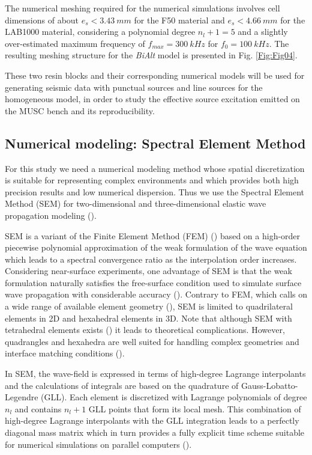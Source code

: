 \documentclass[extra,mreferee]{gji}
\newcommand{\bialt}{\textit{BiAlt} }
\begin{document}
The numerical meshing required for the numerical simulations involves cell dimensions of about $e_{s}<3.43\ mm$ for the F50 material and $e_{s}<4.66\ mm$ for the LAB1000 material, considering a polynomial degree $n_{l}+1=5$ and a slightly over-estimated maximum frequency of $f_{max}=300\ kHz$ for $f_{0}=100\ kHz$. The resulting meshing structure for the \bialt model is presented in Fig. \ref{Fig:Fig04}.

These two resin blocks and their corresponding numerical models will be used for generating seismic data with punctual sources and line sources for the homogeneous model, in order to study the effective source excitation emitted on the MUSC bench and its reproducibility.

\subsection{Numerical modeling: Spectral Element Method}

For this study we need a numerical modeling method whose spatial discretization is suitable for representing complex environments and which provides both high precision results and low numerical dispersion. Thus we use the Spectral Element Method (SEM) for two-dimensional and three-dimensional elastic wave propagation modeling (\cite{Komatitsch_SEM_1998,Komatitsch_ISM_1999,Komatitsch_SEM_2005,Festa_PML_2005}). 

SEM is a variant of the Finite Element Method (FEM) (\cite{Lysmer_FEM_1972,Seron_FEM_1990,Hulbert_FEM_1990,Tromp_SEM_2008}) based on a high-order piecewise polynomial approximation of the weak formulation of the wave equation which leads to a spectral convergence ratio as the interpolation order increases. Considering near-surface experiments, one advantage of SEM is that the weak formulation naturally satisfies the free-surface condition used to simulate surface wave propagation with considerable accuracy (\cite{komatitsch1998spectral,komatitsch1999spectral,Komatitsch_SEM_2005}). Contrary to FEM, which calls on a wide range of available element geometry (\cite{dhatt1984finite}), SEM is limited to quadrilateral elements in 2D and hexahedral elements in 3D. Note that although SEM with tetrahedral elements exists (\cite{komatitsch2001wave}) it leads to theoretical complications. However, quadrangles and hexahedra are well suited for handling complex geometries and interface matching conditions (\cite{Cristini_SEM_2012}). 

In SEM, the wave-field is expressed in terms of high-degree Lagrange interpolants and the calculations of integrals are based on the quadrature of Gauss-Lobatto-Legendre (GLL). Each element is discretized with Lagrange polynomials of degree $n_{l}$ and contains $n_{l}+1$ GLL points that form its local mesh. This combination of high-degree Lagrange interpolants with the GLL integration leads to a perfectly diagonal mass matrix which in turn provides a fully explicit time scheme suitable for numerical simulations on parallel computers (\cite{komatitsch1998spectral,komatitsch1999spectral}).
\end{document}
